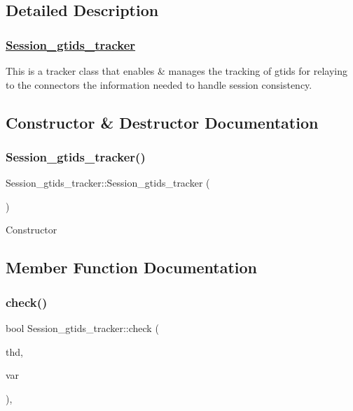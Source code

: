 \subsection{Detailed Description}
\subsubsection*{\mbox{\hyperlink{classSession__gtids__tracker}{Session\+\_\+gtids\+\_\+tracker}} }

This is a tracker class that enables \& manages the tracking of gtids for relaying to the connectors the information needed to handle session consistency. 

\subsection{Constructor \& Destructor Documentation}
\mbox{\label{classSession__gtids__tracker_aab77dd31ff4b4101881c55f040615d07}} 
\subsubsection{\texorpdfstring{Session\+\_\+gtids\+\_\+tracker()}{Session\_gtids\_tracker()}}
{\footnotesize\ttfamily Session\+\_\+gtids\+\_\+tracker\+::\+Session\+\_\+gtids\+\_\+tracker (\begin{DoxyParamCaption}{ }\end{DoxyParamCaption})\hspace{0.3cm}{\ttfamily [inline]}}

Constructor 

\subsection{Member Function Documentation}
\mbox{\label{classSession__gtids__tracker_a92148b2f6afc9101d8a56b35525491ed}} 
\subsubsection{\texorpdfstring{check()}{check()}}
{\footnotesize\ttfamily bool Session\+\_\+gtids\+\_\+tracker\+::check (\begin{DoxyParamCaption}\item[{T\+HD $\ast$}]{thd,  }\item[{\mbox{\hyperlink{classset__var}{set\+\_\+var}} $\ast$}]{var }\end{DoxyParamCaption})\hspace{0.3cm}{\ttfamily [inline]}, {\ttfamily [virtual]}}

